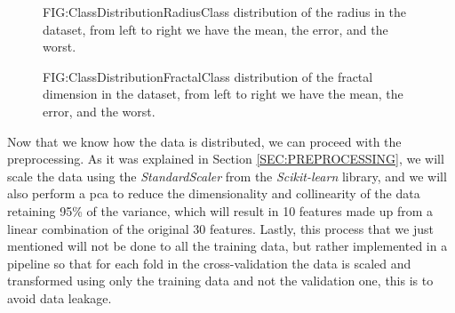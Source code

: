 \begin{figure}[Class Distribution of the Radius]{FIG:ClassDistributionRadius}{Class distribution of the radius in the dataset, from left to right we have the mean, the error, and the worst.}
\end{figure}

\begin{figure}[Class Distribution of the Fractal Dimension]{FIG:ClassDistributionFractal}{Class distribution of the fractal dimension in the dataset, from left to right we have the mean, the error, and the worst.}
\end{figure}

Now that we know how the data is distributed, we can proceed with the preprocessing. As it was explained in Section \ref{SEC:PREPROCESSING}, we will scale the data using the \textit{StandardScaler} from the \textit{Scikit-learn} library, and we will also perform a \ac{pca} to reduce the dimensionality and collinearity of the data retaining 95\% of the variance, which will result in 10 features made up from a linear combination of the original 30 features. Lastly, this process that we just mentioned will not be done to all the training data, but rather implemented in a pipeline so that for each fold in the cross-validation the data is scaled and transformed using only the training data and not the validation one, this is to avoid data leakage.